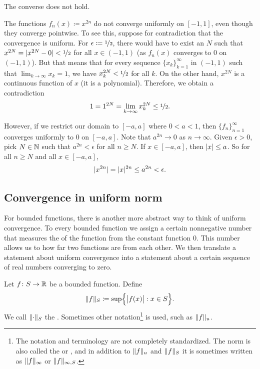 The converse does not hold.

\begin{example}
The functions $f_n(x) \coloneqq x^{2n}$ do not converge uniformly on $[-1,1]$,
even though they converge pointwise.  To see this, suppose for contradiction
that the convergence is uniform.  For $\epsilon \coloneqq \nicefrac{1}{2}$, there would have
to exist an $N$ such that $x^{2N} = \lvert {x^{2N} - 0} \rvert < \nicefrac{1}{2}$ for all $x \in
(-1,1)$ (as $f_n(x)$ converges to 0 on $(-1,1)$).  But that means that
for every sequence $\{ x_k \}_{k=1}^\infty$ in $(-1,1)$ such that $\lim_{k\to\infty} x_k = 1$,
we have $x_k^{2N} < \nicefrac{1}{2}$ for all $k$.  On the other hand,
$x^{2N}$ is a continuous function of $x$ (it is a polynomial).  Therefore,
we obtain a contradiction
\begin{equation*}
1 = 1^{2N}  = \lim_{k\to\infty} x_k^{2N} \leq \nicefrac{1}{2} .
\end{equation*}

However, if we restrict our domain to $[-a,a]$ where $0 < a < 1$, then
$\{ f_n \}_{n=1}^\infty$ converges uniformly to 0 on $[-a,a]$.  Note that
$a^{2n} \to 0$ as $n \to \infty$.  Given $\epsilon > 0$,
pick $N \in {\mathbb{N}}$ such that
$a^{2n} < \epsilon$ for all $n \geq N$.
If $x \in [-a,a]$, then
$\lvert {x} \rvert \leq a$.  So
for all $n \geq N$ and all $x \in [-a,a]$,
\begin{equation*}
\lvert {x^{2n}} \rvert = \lvert {x} \rvert^{2n} \leq a^{2n} < \epsilon .
\end{equation*}
\end{example}

\subsection{Convergence in uniform norm}

For bounded functions, there is another more abstract way to 
think of uniform convergence.  To every bounded function we assign
a certain nonnegative number that
measures the  of the function from the constant
function $0$.
This number allows us to
how far two functions are from each other.  We then translate
a statement about uniform convergence into a statement about a certain
sequence of real numbers converging to zero.

\begin{defn} \label{def:unifnorm}
Let $f \colon S \to {\mathbb{R}}$ be a bounded function.  Define
\begin{equation*}
\snorm{f}_S \coloneqq
\sup \Bigl\{ \babs{f(x)} : x \in S \Bigr\} .
\avoidbreak
\end{equation*}
We call $\lVert {\cdot} \rVert_S$ the \emph{}.
Sometimes other notation\footnote{The notation and terminology
are not completely standardized.  The norm is also called the
\emph{} or
\emph{}, and in addition
to $\lVert {f} \rVert_u$ and $\lVert {f} \rVert_S$ it is sometimes written
as $\lVert {f} \rVert_{\infty}$ or $\lVert {f} \rVert_{\infty,S}$.}
is used, such as $\lVert {f} \rVert_u$.
\end{defn}

